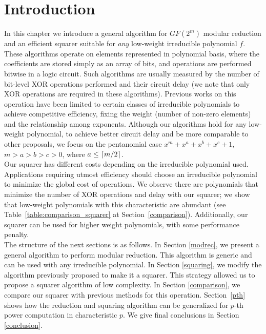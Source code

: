 \section{Introduction}

In this chapter we introduce a general algorithm for $GF(2^m)$ modular reduction and an efficient squarer suitable for \emph{any} low-weight irreducible polynomial $f$. These algorithms operate on elements represented in polynomial basis, where the coefficients are stored simply as an array of bits, and operations are performed bitwise in a logic circuit. Such algorithms are usually measured by the number of bit-level XOR operations performed and their circuit delay (we note that only XOR operations are required in these algorithms). Previous works on this operation have been limited to certain classes of irreducible polynomials to achieve competitive efficiency, fixing the weight (number of non-zero elements) and the relationship among exponents. 
Although our algorithms hold for any low-weight polynomial, to achieve better circuit delay and be more comparable to other proposals, we focus on the pentanomial case $x^m+x^a+x^b+x^c+1$, $m > a > b > c > 0$, where $a \leq \lceil m/2\rceil$.\\

Our squarer has different costs depending on the irreducible polynomial used. Applications requiring utmost efficiency should choose an irreducible polynomial to minimize the global cost of operations. We observe there are polynomials that minimize the number of XOR operations and delay with our squarer; we show that low-weight polynomials with this characteristic are abundant (see Table~\ref{table:comparison_squarer} at Section~\ref{comparison}). Additionally, our squarer can be used for higher weight polynomials, with some performance penalty.\\

The structure of the next sections is as follows. In Section \ref{modrec}, we present a general algorithm to perform modular reduction. This algorithm is generic and can be used with any irreducible polynomial. In Section \ref{squaring}, we modify the algorithm previously proposed to make it a squarer. This strategy allowed us to propose a squarer algorithm of low complexity. In Section \ref{comparison}, we compare our squarer with previous methods for this operation. Section~\ref{pth} shows how the reduction and squaring algorithm can be generalized for $p$-th power computation in characteristic $p$. We give final conclusions in Section \ref{conclusion}.


